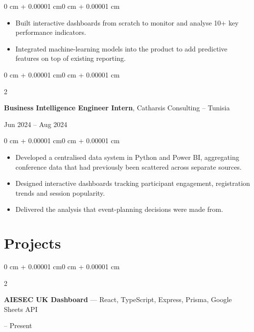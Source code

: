 \documentclass[10pt, letterpaper]{article}
\newenvironment{highlights}{
    \begin{itemize}[
        topsep=0.10 cm,
        parsep=0.10 cm,
        partopsep=0pt,
        itemsep=0pt,
        leftmargin=0 cm + 10pt
    ]
}{
    \end{itemize}
}
\newenvironment{onecolentry}{
    \begin{adjustwidth}{0 cm + 0.00001 cm}{0 cm + 0.00001 cm}
}{
    \end{adjustwidth}
}
\newenvironment{twocolentry}[2][]{
    \onecolentry
    \def\secondColumn{#2}
    \setcolumnwidth{\fill, 4.5 cm}
    \begin{paracol}{2}
}{
    \switchcolumn \raggedleft \secondColumn
    \end{paracol}
    \endonecolentry
}
\begin{document}
\vspace{0.10 cm}

\begin{onecolentry}
    \begin{highlights}
        \item Built interactive dashboards from scratch to monitor and analyse 10+ key
              performance indicators.
        \item Integrated machine-learning models into the product to add predictive features on
              top of existing reporting.
    \end{highlights}
\end{onecolentry}

\vspace{0.2 cm}

\begin{twocolentry}{Jun 2024 -- Aug 2024}
    \textbf{Business Intelligence Engineer Intern}, Catharsis Consulting -- Tunisia
\end{twocolentry}

\vspace{0.10 cm}

\begin{onecolentry}
    \begin{highlights}
        \item Developed a centralised data system in Python and Power BI, aggregating
              conference data that had previously been scattered across separate sources.
        \item Designed interactive dashboards tracking participant engagement, registration
              trends and session popularity.
        \item Delivered the analysis that event-planning decisions were made from.
    \end{highlights}
\end{onecolentry}

\section{Projects}

\begin{twocolentry}{2026 -- Present}
    \textbf{AIESEC UK Dashboard} \textnormal{--- React, TypeScript, Express, Prisma,
    Google Sheets API}
\end{twocolentry}
\end{document}
